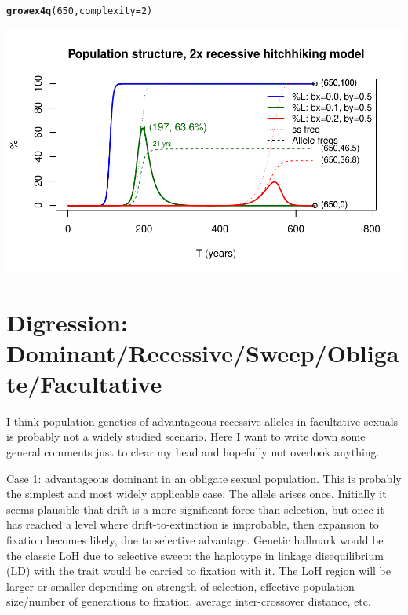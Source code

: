 \documentclass{article}\usepackage[]{graphicx}\usepackage[]{color}
\makeatletter
\def\maxwidth{ %
  \ifdim\Gin@nat@width>\linewidth
    \linewidth
  \else
    \Gin@nat@width
  \fi
}
\newcommand{\hlnum}[1]{\textcolor[rgb]{0.686,0.059,0.569}{#1}}%
\newcommand{\hlstd}[1]{\textcolor[rgb]{0.345,0.345,0.345}{#1}}%
\newcommand{\hlkwc}[1]{\textcolor[rgb]{0.333,0.667,0.333}{#1}}%
\newcommand{\hlkwd}[1]{\textcolor[rgb]{0.737,0.353,0.396}{\textbf{#1}}}%
\newenvironment{kframe}{%
 \def\at@end@of@kframe{}%
 \ifinner\ifhmode%
  \def\at@end@of@kframe{\end{minipage}}%
  \begin{minipage}{\columnwidth}%
 \fi\fi%
 \def\FrameCommand##1{\hskip\@totalleftmargin \hskip-\fboxsep
 \colorbox{shadecolor}{##1}\hskip-\fboxsep
     \hskip-\linewidth \hskip-\@totalleftmargin \hskip\columnwidth}%
 \MakeFramed {\advance\hsize-\width
   \@totalleftmargin\z@ \linewidth\hsize
   \@setminipage}}%
 {\par\unskip\endMakeFramed%
 \at@end@of@kframe}
\newenvironment{knitrout}{}{} %
\makeatother
\begin{document}
\begin{knitrout}\footnotesize
{}\color{fgcolor}\begin{kframe}
\begin{alltt}
\hlkwd{growex4q}\hlstd{(}\hlnum{650}\hlstd{,}\hlkwc{complexity}\hlstd{=}\hlnum{2}\hlstd{)}
\end{alltt}
\end{kframe}

{\centering \includegraphics[width=\maxwidth]{asex-figs-knitr/recessive-x2-hitch-1} 

}



\end{knitrout}

\section{Digression: Dominant/Recessive/Sweep/Obligate/Facultative}
\label{sec:sweepish}

I think population genetics of advantageous recessive alleles in facultative sexuals is probably not
a widely studied scenario.  Here I want to write down some general comments just to clear my head
and hopefully not overlook anything.

Case 1: advantageous dominant in an obligate sexual population.  This is probably the simplest and
most widely applicable case.  The allele arises once.  Initially it seems plausible that drift is a
more significant force than selection, but once it has reached a level where drift-to-extinction is
improbable, then expansion to fixation becomes likely, due to selective advantage.  Genetic hallmark
would be the classic LoH due to selective sweep: the haplotype in linkage disequilibrium (LD) with
the trait would be carried to fixation with it.  The LoH region will be larger or smaller depending
on strength of selection, effective population size/number of generations to fixation, average
inter-crossover distance, etc.
\end{document}
